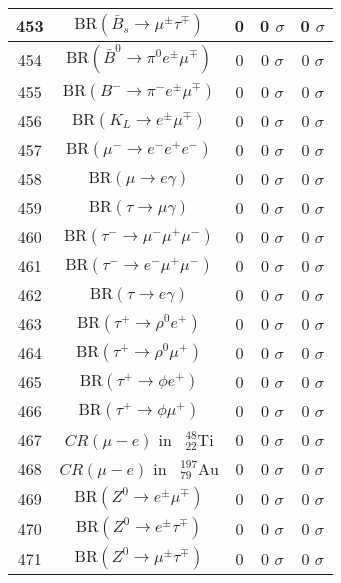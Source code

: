 \begin{longtable}{|c|c|c|c|c|}
453 &	 $\mathrm{BR}(\bar B_s\to \mu^\pm \tau^\mp)$ &	 0 &	 0 $ \sigma$ &	 0 $ \sigma$ \\ \hline
454 &	 $\mathrm{BR}(\bar B^0\to \pi^0 e^\pm\mu^\mp)$ &	 0 &	 0 $ \sigma$ &	 0 $ \sigma$ \\ \hline
455 &	 $\mathrm{BR}(B^-\to \pi^- e^\pm\mu^\mp)$ &	 0 &	 0 $ \sigma$ &	 0 $ \sigma$ \\ \hline
456 &	 $\mathrm{BR}(K_L\to e^\pm\mu^\mp)$ &	 0 &	 0 $ \sigma$ &	 0 $ \sigma$ \\ \hline
457 &	 $\mathrm{BR}(\mu^-\to e^-e^+e^-)$ &	 0 &	 0 $ \sigma$ &	 0 $ \sigma$ \\ \hline
458 &	 $\mathrm{BR}(\mu\to e\gamma)$ &	 0 &	 0 $ \sigma$ &	 0 $ \sigma$ \\ \hline
459 &	 $\mathrm{BR}(\tau\to \mu\gamma)$ &	 0 &	 0 $ \sigma$ &	 0 $ \sigma$ \\ \hline
460 &	 $\mathrm{BR}(\tau^-\to \mu^-\mu^+\mu^-)$ &	 0 &	 0 $ \sigma$ &	 0 $ \sigma$ \\ \hline
461 &	 $\mathrm{BR}(\tau^-\to e^-\mu^+\mu^-)$ &	 0 &	 0 $ \sigma$ &	 0 $ \sigma$ \\ \hline
462 &	 $\mathrm{BR}(\tau\to e\gamma)$ &	 0 &	 0 $ \sigma$ &	 0 $ \sigma$ \\ \hline
463 &	 $\mathrm{BR}(\tau^+\to \rho^0 e^+)$ &	 0 &	 0 $ \sigma$ &	 0 $ \sigma$ \\ \hline
464 &	 $\mathrm{BR}(\tau^+\to \rho^0\mu^+)$ &	 0 &	 0 $ \sigma$ &	 0 $ \sigma$ \\ \hline
465 &	 $\mathrm{BR}(\tau^+\to \phi e^+)$ &	 0 &	 0 $ \sigma$ &	 0 $ \sigma$ \\ \hline
466 &	 $\mathrm{BR}(\tau^+\to \phi\mu^+)$ &	 0 &	 0 $ \sigma$ &	 0 $ \sigma$ \\ \hline
467 &	 $CR(\mu - e)$ in $\phantom k^{48}_{22} \mathrm{Ti}$ &	 0 &	 0 $ \sigma$ &	 0 $ \sigma$ \\ \hline
468 &	 $CR(\mu - e)$ in $\phantom k^{197}_{79} \mathrm{Au}$ &	 0 &	 0 $ \sigma$ &	 0 $ \sigma$ \\ \hline
469 &	 $\mathrm{BR}(Z^0\to  e^\pm\mu^\mp)$ &	 0 &	 0 $ \sigma$ &	 0 $ \sigma$ \\ \hline
470 &	 $\mathrm{BR}(Z^0\to  e^\pm\tau^\mp)$ &	 0 &	 0 $ \sigma$ &	 0 $ \sigma$ \\ \hline
471 &	 $\mathrm{BR}(Z^0\to \mu^\pm\tau^\mp)$ &	 0 &	 0 $ \sigma$ &	 0 $ \sigma$ \\ \hline
\end{longtable}